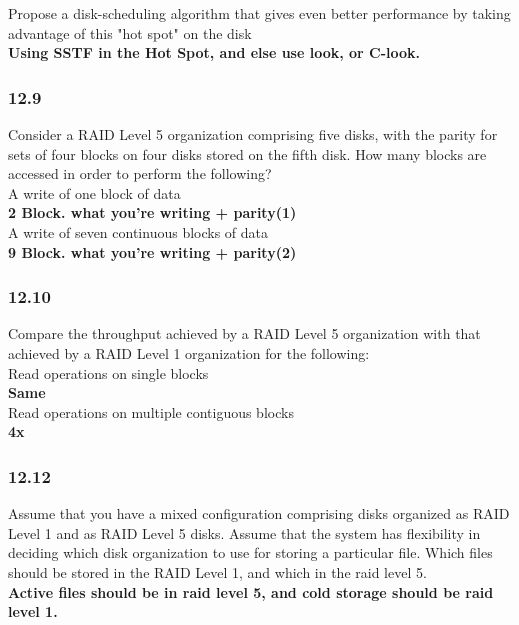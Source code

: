 \documentclass[a4paper,10pt,titlepage]{report}
\begin{document}
\hspace{10mm} Propose a disk-scheduling algorithm that gives even better performance by taking advantage of this "hot spot" on the disk \\
\hspace{15mm}\textbf{Using SSTF in the Hot Spot, and else use look, or C-look.} \\


\subsubsection{12.9} Consider a RAID Level 5 organization comprising five disks, with the parity for sets of four blocks on four disks stored on the fifth disk. How many blocks are accessed in order to perform the following?\\
\hspace{10mm} 	A write of one block of data\\
\hspace{15mm}\textbf{2 Block. what you're writing + parity(1)} \\
\hspace{10mm} 	A write of seven continuous blocks of data\\
\hspace{15mm}\textbf{9 Block. what you're writing + parity(2)} \\


\subsubsection{12.10} Compare the throughput achieved by a RAID Level 5 organization with that achieved by a RAID Level 1 organization for the following: \\
\hspace{10mm} 	Read operations on single blocks \\
\hspace{15mm} \textbf{Same} \\
\hspace{10mm} 	Read operations on multiple contiguous blocks \\
\hspace{15mm} \textbf{4x} \\

\subsubsection{12.12} Assume that you have a mixed configuration comprising disks organized as RAID Level 1 and as RAID Level 5 disks. Assume that the system has flexibility in deciding which disk organization to use for storing a particular file. Which files should be stored in the RAID Level 1, and which in the raid level 5.\\
\hspace{15mm} \textbf{Active files should be in raid level 5, and cold storage should be raid level 1.} \\
\end{document}
